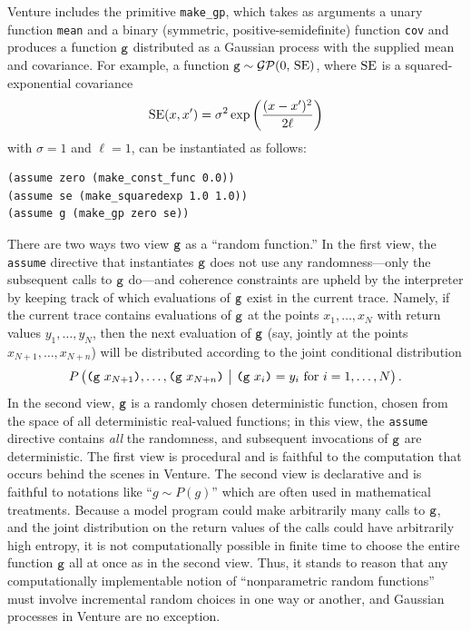 Venture includes the primitive \texttt{make\_gp}, which takes as arguments a
unary function \texttt{mean} and a binary (symmetric, positive-semidefinite)
function \texttt{cov} and produces a function $\texttt{g}$ distributed as a Gaussian
process with the supplied mean and covariance.  For example, a function $\texttt{g}
\sim \mathcal{GP}(0,\,\operatorname{SE})$, where $\operatorname{SE}$ is a squared-exponential covariance
\[ \operatorname{SE}(x, x') = \sigma^2 \exp\left( \frac{(x-x')^2}{2\ell} \right) \]
with $\sigma=1$ and $\ell=1$, can be instantiated as follows:
\begin{lstlisting}[language=Venture]
(assume zero (make_const_func 0.0))
(assume se (make_squaredexp 1.0 1.0))
(assume g (make_gp zero se))
\end{lstlisting}
There are two ways two view $\texttt{g}$ as a ``random function.'' In the first view,
the \texttt{assume} directive that instantiates $\texttt{g}$ does not use any
randomness---only the subsequent calls to $\texttt{g}$ do---and coherence constraints
are upheld by the interpreter by keeping track of which evaluations of $\texttt{g}$
exist in the current trace.  Namely, if the current trace contains evaluations
of $\texttt{g}$ at the points $x_1,\ldots,x_N$ with return values $y_1,\ldots,y_N$,
then the next evaluation of $\texttt{g}$ (say, jointly at the points $x_{N+1}, \ldots,
x_{N+n}$) will be distributed according to the joint conditional distribution
\[
  P\left( \big.
    \texttt(\texttt{g}\ x_{N+1}\texttt), \ldots, \texttt(\texttt{g}\ x_{N+n}\texttt)
    \ \middle\vert\ 
    \texttt(\texttt{g}\ x_i\texttt) = y_i \text{ for $i=1,\ldots,N$} \right).
\]
In the second view, $\texttt{g}$ is a randomly chosen deterministic function, chosen
from the space of all deterministic real-valued functions; in this view, the
\texttt{assume} directive contains \emph{all} the randomness, and subsequent
invocations of $\texttt{g}$ are deterministic.  The first view is procedural and is
faithful to the computation that occurs behind the scenes in Venture.  The
second view is declarative and is faithful to notations like ``$g \sim P(g)$''
which are often used in mathematical treatments.  Because a model program could
make arbitrarily many calls to $\texttt{g}$, and the joint distribution on the return
values of the calls could have arbitrarily high entropy, it is not
computationally possible in finite time to choose the entire function $\texttt{g}$ all
at once as in the second view.  Thus, it stands to reason that any
computationally implementable notion of ``nonparametric random functions'' must
involve incremental random choices in one way or another, and Gaussian processes
in Venture are no exception.

